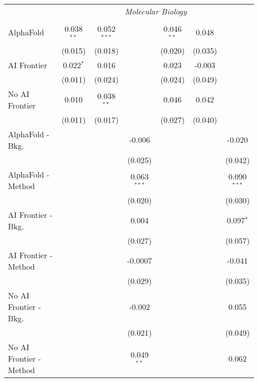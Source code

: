 \begin{tabular}{lcccccc}
 & \multicolumn{6}{c}{\textit{Molecular Biology}} \\ \\
   AlphaFold               & 0.038$^{**}$ & 0.052$^{***}$ &               & 0.046$^{**}$ & 0.048   &   \\   
                           & (0.015)      & (0.018)       &               & (0.020)      & (0.035) &   \\   
   AI Frontier             & 0.022$^{*}$  & 0.016         &               & 0.023        & -0.003  &   \\   
                           & (0.011)      & (0.024)       &               & (0.024)      & (0.049) &   \\   
   No AI Frontier          & 0.010        & 0.038$^{**}$  &               & 0.046        & 0.042   &   \\   
                           & (0.011)      & (0.017)       &               & (0.027)      & (0.040) &   \\   
   AlphaFold - Bkg.        &              &               & -0.006        &              &         & -0.020\\   
                           &              &               & (0.025)       &              &         & (0.042)\\   
   AlphaFold - Method      &              &               & 0.063$^{***}$ &              &         & 0.090$^{***}$\\   
                           &              &               & (0.020)       &              &         & (0.030)\\   
   AI Frontier - Bkg.      &              &               & 0.004         &              &         & 0.097$^{*}$\\   
                           &              &               & (0.027)       &              &         & (0.057)\\   
   AI Frontier - Method    &              &               & -0.0007       &              &         & -0.041\\   
                           &              &               & (0.029)       &              &         & (0.035)\\   
   No AI Frontier - Bkg.   &              &               & -0.002        &              &         & 0.055\\   
                           &              &               & (0.021)       &              &         & (0.049)\\   
   No AI Frontier - Method &              &               & 0.049$^{**}$  &              &         & 0.062\\   

\end{tabular}
